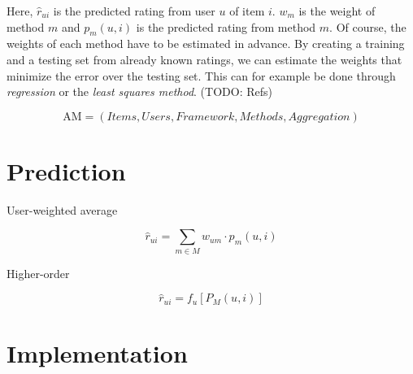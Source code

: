 Here, $\hat{r}_{ui}$ is the predicted rating from user $u$ of item $i$.
$w_m$ is the weight of method $m$ and $p_m(u,i)$ is the predicted rating from method $m$.
Of course, the weights of each method have to be estimated in advance.
By creating a training and a testing set from already known ratings, we can estimate the weights
that minimize the error over the testing set. 
This can for example be done through \emph{regression} or the \emph{least squares method}.
(TODO: Refs)




\clearpage

\begin{equation*}
  \mathrm{AM} = (Items, Users, Framework, Methods, Aggregation)
\end{equation*}

\section{Prediction}

User-weighted average

\begin{equation*}
  \hat{r}_{ui} = \sum_{m \in M} w_{um} \cdot p_m(u,i)
\end{equation*}


Higher-order

\begin{equation*}
  \hat{r}_{ui} = f_{u}[ P_{M}(u,i) ]
\end{equation*}





\section{Implementation}      



